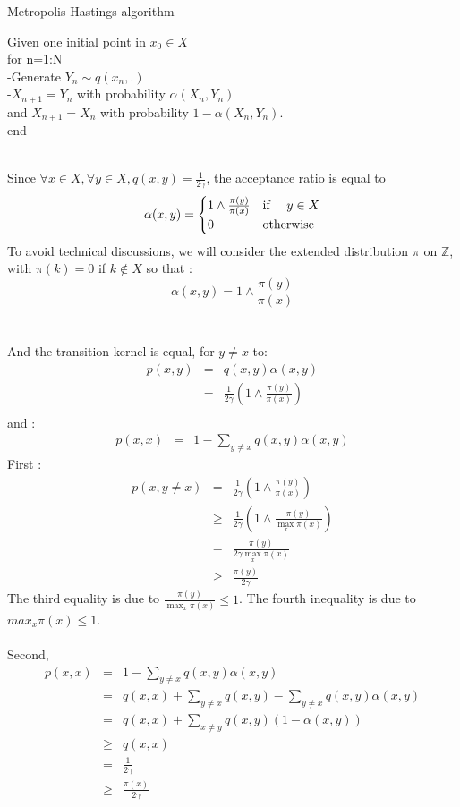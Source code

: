 	\begin{algorithm}
		\caption{Metropolis Hastings algorithm}\label{RS}
		Given one initial point in $x_0 \in X$~\\
		for n=1:N~\\
		-Generate $Y_n \sim q(x_n,.) $~\\
		-$X_{n+1}=Y_n$ with probability $\alpha(X_n, Y_n)$~\\
		and $X_{n+1}=X_{n}$ with probability $1-\alpha(X_n, Y_n)$.~\\
		end~\\
	\end{algorithm}
	~\\
	Since $\forall x \in X, \forall y \in X, q(x,y)=\frac{1}{2\gamma}$, the acceptance ratio is equal to 
	$$
	\alpha(x,y) =
	\begin{cases}
	1 \wedge \frac{\pi(y)}{\pi(x)} & \text{if \quad }  y \in X\\
	0 & \text{otherwise}
	\end{cases}
	$$
	To avoid technical discussions, we will consider the extended distribution $\pi$ on $\mathbb{Z}$, with $\pi(k)=0$ if $k \notin X$ so that :
	$$
	\alpha(x,y) = 1 \wedge \frac{\pi(y)}{\pi(x)} 
	$$
	~\\
	~\\
	And the transition kernel is equal, for $y \neq x$ to:
	\begin{eqnarray*}
		p(x,y)&=& q(x,y)\alpha(x,y)\\
		&=& \frac{1}{2\gamma} ( 1 \wedge \frac{\pi(y)}{\pi(x)} ) \\ 	
	\end{eqnarray*}
	and : 
	\begin{eqnarray*}
		p(x,x)&=& 1-\sum_{y \neq x}q(x,y)\alpha(x,y) 	
	\end{eqnarray*}
	First :
	\begin{eqnarray*}
		p(x,y \neq x) & = & \frac{1}{2\gamma}(1 \wedge \frac{\pi(y)}{\pi(x)})\\
		& \geq & \frac{1}{2\gamma }(1 \wedge \frac{\pi(y)}{\max_x \pi(x)})\\
		& = &  \frac{\pi(y)}{2\gamma \max_x \pi(x)}\\
		& \geq & 	 \frac{\pi(y)}{2\gamma}	 
	\end{eqnarray*}
	The third equality is due to $\frac{\pi(y)}{\max_x \pi(x)} \leq 1 $.
	The fourth inequality is due to $max_x \pi(x) \leq 1$.~\\
	~\\
	Second, 
	\begin{eqnarray*}
		p(x,x)&=& 1-\sum_{y \neq x}q(x,y)\alpha(x,y) \\
		&=& q(x,x)+\sum_{y \neq x}q(x,y) -\sum_{y \neq x}q(x,y)\alpha(x,y)\\
		&=& q(x,x) + \sum_{x \neq y}q(x,y)(1-\alpha(x,y))\\
		& \geq & q(x,x)\\
		& = & \frac{1}{2\gamma}\\
		& \geq & \frac{\pi(x)}{2\gamma} 
	\end{eqnarray*}
